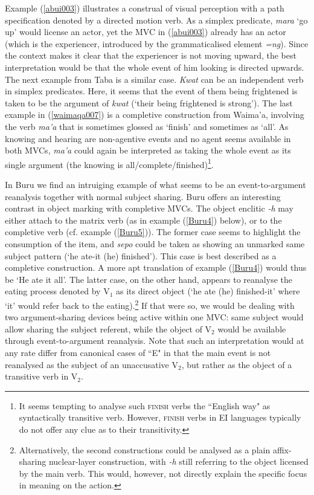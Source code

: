 Example (\ref{abui003}) illustrates a construal of visual perception with a path specification denoted by a directed motion verb. As a simplex predicate, \textit{mara} `go up' would license an actor, yet the MVC in (\ref{abui003}) already has an actor (which is the experiencer, introduced by the grammaticalised element \textit{=ng}). Since the context makes it clear that the experiencer is not moving upward, the best interpretation would be that the whole event of him looking is directed upwards. The next example from Taba is a similar case. \textit{Kwat} can be an independent verb in simplex predicates. Here, it seems that the event of them being frightened is taken to be the argument of \textit{kwat} (`their being frightened is strong'). The last example in (\ref{waimaqa007}) is a completive construction from Waima'a, involving the verb \textit{ma'a} that is sometimes glossed as `finish' and sometimes as `all'. As knowing and hearing are non-agentive events and no agent seems available in both MVCs, \textit{ma'a} could again be interpreted as taking the whole event as its single argument (the knowing is all/complete/finished)\footnote{It seems tempting to analyse such \textsc{finish} verbs the ``English way" as syntactically transitive verb. However, \textsc{finish} verbs in EI languages typically do not offer any clue as to their transitivity.}.

In Buru we find an intruiging example of what seems to be an event-to-ar\-gu\-ment reanalysis together with normal subject sharing. Buru offers an interesting contrast in object marking with completive MVCs. The object enclitic \textit{-h} may either attach to the matrix verb (as in example (\ref{Buru4}) below), or to the completive verb (cf. example (\ref{Buru5})). The former case seems to highlight the consumption of the item, and \textit{sepo} could be taken as showing an unmarked same subject pattern (`he ate-it (he) finished'). This case is best described as a completive construction. A more apt translation of example (\ref{Buru4}) would thus be `He ate it all'. The latter case, on the other hand, appears to reanalyse the eating process denoted by V$_1$ as its direct object (`he ate (he) finished-it' where `it' would refer back to the eating).\footnote{Alternatively, the second constructions could be analysed as a plain affix-sharing nuclear-layer construction, with \textit{-h} still referring to the object licensed by the main verb. This would, however, not directly explain the specific focus in meaning on the action.} If that were so, we would be dealing with two argument-sharing devices being active within one MVC: same subject would allow sharing the subject referent, while the object of V$_2$ would be available through event-to-argument reanalysis. Note that such an interpretation would at any rate differ from canonical cases of ``E" in that the main event is not reanalysed as the subject of an unaccusative V$_2$, but rather as the object of a transitive verb in V$_2$. 

